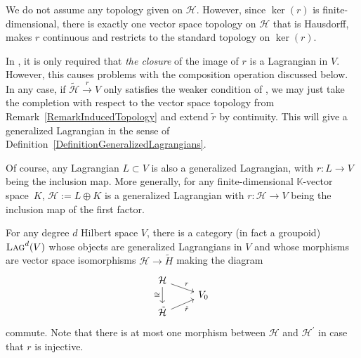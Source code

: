 \documentclass[10pt,a4paper]{amsart}
\numberwithin{equation}{section}
\newcommand{\Lag}{\textsc{Lag}}
\begin{document}
\begin{Remark}
\label{RemarkInducedTopology}
 We do not assume any topology given on $\mathcal{H}$.
 However, since $\ker(r)$ is finite-dimensional, there is exactly one vector space topology on $\mathcal{H}$ that is Hausdorff, makes $r$ continuous and restricts to the standard topology on $\ker(r)$.
\end{Remark}

\begin{Remark}
In \cite[Definition~2.2.9]{StolzTeichnerElliptic}, it is only required that \emph{the closure} of the image of $r$ is a Lagrangian in $V$.
However, this causes problems with the composition operation discussed below.
In any case, if $\tilde{\mathcal{H}} \stackrel{r}{\to} V$ only satisfies the weaker condition of \cite{StolzTeichnerElliptic}, we may just take the completion with respect to the vector space topology from Remark~\ref{RemarkInducedTopology} and extend $\tilde{r}$ by continuity.
This will give a generalized Lagrangian in the sense of Definition~\ref{DefinitionGeneralizedLagrangians}.
\end{Remark}

\begin{Example}
 Of course, any Lagrangian $L \subset V$ is also a generalized Lagrangian, with $r\colon L \to V$ being the inclusion map.
 More generally, for any finite-dimensional $\mathbb{K}$-vector space~$K$, $\mathcal{H} := L \oplus K$ is a generalized Lagrangian with $r\colon \mathcal{H} \to V$ being the inclusion map of the first factor.
\end{Example}

 For any degree $d$ Hilbert space $V$, there is a category (in fact a groupoid) $\Lag^d(V)$ whose objects are generalized Lagrangians in $V$ and whose morphisms are vector space isomorphisms $\mathcal{H} \to \tilde{H}$ making the diagram
 \begin{equation*}
\begin{tikzcd}[row sep = 0.2mm]
 \mathcal{H} \ar[dr, "r"] \ar[dd, "\cong"']&\\
 & V_0 \\
\tilde{\mathcal{H}} \ar[ur, "\tilde{r}"'] &
\end{tikzcd}
\end{equation*}
commute.
Note that there is at most one morphism between $\mathcal{H}$ and $\mathcal{H}^\prime$ in case that $r$ is injective.
\end{document}
